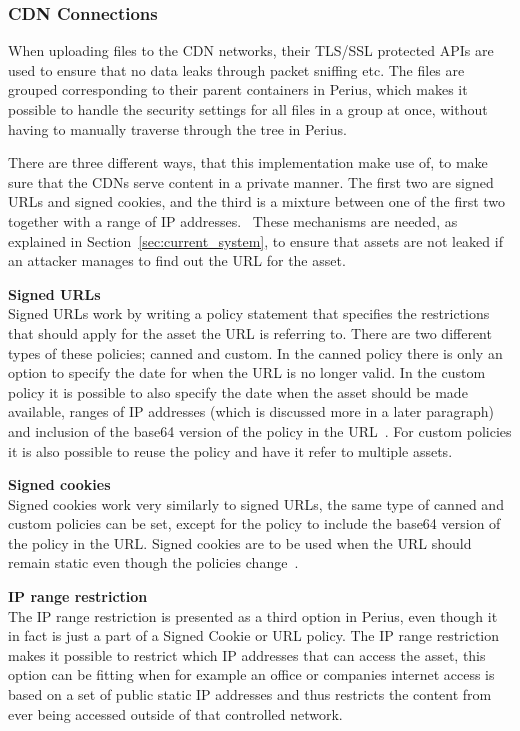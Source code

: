 \documentclass[a4paper,12pt]{article}
\newcounter{subsubsubsection}[subsubsection]
\begin{document}
\subsubsection{CDN Connections} \label{sec:cdn_connections}
When uploading files to the CDN networks, their TLS/SSL protected APIs are used to ensure that no
data leaks through packet sniffing etc. The files are grouped corresponding to their parent
containers in Perius, which makes it possible to handle the security settings for all files in a
group at once, without having to manually traverse through the tree in Perius.

 \label{sec:private_content}
There are three different ways, that this implementation make use of, to make sure that the CDNs
serve content in a private manner. The first two are signed URLs and signed cookies, and the third
is a mixture between one of the first two together with a range of IP addresses.~\cite{AWSPRIVATE}
These mechanisms are needed, as explained in Section~\ref{sec:current_system}, to ensure that assets
are not leaked if an attacker manages to find out the URL for the asset. \\

\par \textbf{Signed URLs} \\
Signed URLs work by writing a policy statement that specifies the restrictions that should apply for
the asset the URL is referring to. There are two different types of these policies; canned and
custom. In the canned policy there is only an option to specify the date for when the URL is no 
longer valid. In the custom policy it is possible to also specify the date when the asset should be
made available, ranges of IP addresses (which is discussed more in a later paragraph) and inclusion
of the base64 version of the policy in the URL~\cite{AWSSIGNED}. For custom policies it is also 
possible to reuse the policy and have it refer to multiple assets.\\

\par \textbf{Signed cookies} \\
Signed cookies work very similarly to signed URLs, the same type of canned and custom policies can
be set, except for the policy to include the base64 version of the policy in the URL. Signed cookies
are to be used when the URL should remain static even though the policies change~\cite{AWSCOOKIES}.
\\

\par \textbf{IP range restriction} \\
The IP range restriction is presented as a third option in Perius, even though it in fact is just a
part of a Signed Cookie or URL policy. The IP range restriction makes it possible to restrict which
IP addresses that can access the asset, this option can be fitting when for example an office or
companies internet access is based on a set of public static IP addresses and thus restricts the
content from ever being accessed outside of that controlled network.
\end{document}

